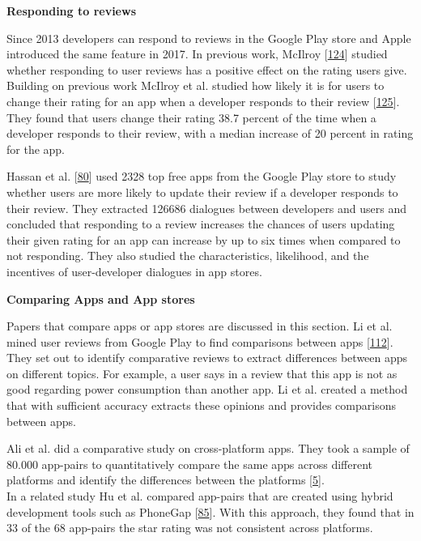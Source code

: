 \documentclass[]{book}
\begin{document}
\textbf{Responding to reviews}

Since 2013 developers can respond to reviews in the Google Play store
and Apple introduced the same feature in 2017. In previous work, McIlroy
{[}\protect\hyperlink{ref-mcilroy2014empirical}{124}{]} studied whether
responding to user reviews has a positive effect on the rating users
give. Building on previous work McIlroy et al. studied how likely it is
for users to change their rating for an app when a developer responds to
their review {[}\protect\hyperlink{ref-mcilroy2017worth}{125}{]}. They
found that users change their rating 38.7 percent of the time when a
developer responds to their review, with a median increase of 20 percent
in rating for the app.

Hassan et al. {[}\protect\hyperlink{ref-hassan2018studying}{80}{]} used
2328 top free apps from the Google Play store to study whether users are
more likely to update their review if a developer responds to their
review. They extracted 126686 dialogues between developers and users and
concluded that responding to a review increases the chances of users
updating their given rating for an app can increase by up to six times
when compared to not responding. They also studied the characteristics,
likelihood, and the incentives of user-developer dialogues in app
stores.

\textbf{Comparing Apps and App stores}

Papers that compare apps or app stores are discussed in this section. Li
et al. mined user reviews from Google Play to find comparisons between
apps {[}\protect\hyperlink{ref-li2017mining}{112}{]}. They set out to
identify comparative reviews to extract differences between apps on
different topics. For example, a user says in a review that this app is
not as good regarding power consumption than another app. Li et al.
created a method that with sufficient accuracy extracts these opinions
and provides comparisons between apps.

Ali et al. did a comparative study on cross-platform apps. They took a
sample of 80.000 app-pairs to quantitatively compare the same apps
across different platforms and identify the differences between the
platforms {[}\protect\hyperlink{ref-ali2017same}{5}{]}.\\
In a related study Hu et al. compared app-pairs that are created using
hybrid development tools such as PhoneGap
{[}\protect\hyperlink{ref-hu2018studying}{85}{]}. With this approach,
they found that in 33 of the 68 app-pairs the star rating was not
consistent across platforms.
\end{document}
